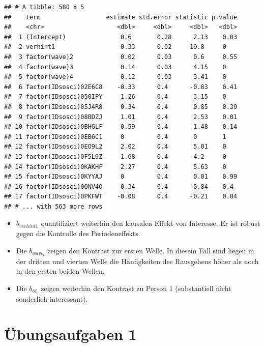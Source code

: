 \documentclass[
]{book}
\providecommand{\tightlist}{%
  \setlength{\itemsep}{0pt}\setlength{\parskip}{0pt}}
\begin{document}
\begin{verbatim}
## # A tibble: 580 x 5
##    term                  estimate std.error statistic p.value
##    <chr>                    <dbl>     <dbl>     <dbl>   <dbl>
##  1 (Intercept)               0.6       0.28      2.13    0.03
##  2 verhint1                  0.33      0.02     19.8     0   
##  3 factor(wave)2             0.02      0.03      0.6     0.55
##  4 factor(wave)3             0.14      0.03      4.15    0   
##  5 factor(wave)4             0.12      0.03      3.41    0   
##  6 factor(IDsosci)02E6C8    -0.33      0.4      -0.83    0.41
##  7 factor(IDsosci)050IPY     1.26      0.4       3.15    0   
##  8 factor(IDsosci)05J4R8     0.34      0.4       0.85    0.39
##  9 factor(IDsosci)08BDZJ     1.01      0.4       2.53    0.01
## 10 factor(IDsosci)0BHGLF     0.59      0.4       1.48    0.14
## 11 factor(IDsosci)0EB6C1     0         0.4       0       1   
## 12 factor(IDsosci)0EO9L2     2.02      0.4       5.01    0   
## 13 factor(IDsosci)0F5L9Z     1.68      0.4       4.2     0   
## 14 factor(IDsosci)0KAKHF     2.27      0.4       5.63    0   
## 15 factor(IDsosci)0KYYAJ     0         0.4       0.01    0.99
## 16 factor(IDsosci)0ONV4O     0.34      0.4       0.84    0.4 
## 17 factor(IDsosci)0PKFWT    -0.08      0.4      -0.21    0.84
## # ... with 563 more rows
\end{verbatim}

\begin{itemize}
\tightlist
\item
  \(b_{verhint1}\) quantifiziert weiterhin den kausalen Effekt von Interesse. Er ist robust gegen die Kontrolle des Periodeneffekts.
\item
  Die \(b_{wave_t}\) zeigen den Kontrast zur ersten Welle. In diesem Fall sind liegen in der dritten und vierten Welle die Häufigkeiten des Rausgehens höher als noch in den ersten beiden Wellen.
\item
  Die \(b_{id_i}\) zeigen weiterhin den Kontrast zu Person 1 (substantiell nicht sonderlich interessant).
\end{itemize}

\hypertarget{uxfcbungsaufgaben-1}{%
\section{Übungsaufgaben 1}\label{uxfcbungsaufgaben-1}}
\end{document}

